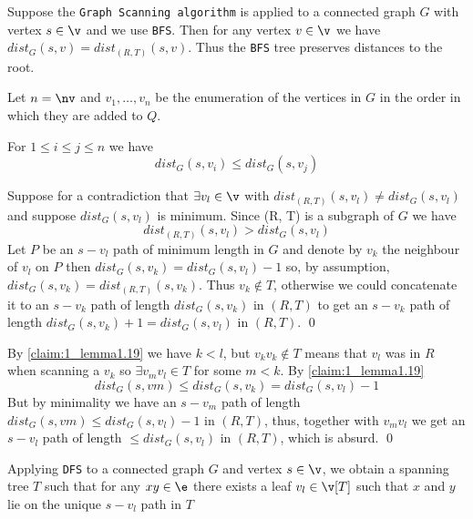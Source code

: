 \begin{lemma}
    Suppose the \texttt{Graph Scanning algorithm} is applied to a connected graph $G$ with vertex $s \in \v$ and we use \texttt{BFS}. Then for any vertex $v \in \v$ we have $dist_G(s, v) = dist_{(R, T)}(s, v)$. Thus the \texttt{BFS} tree preserves distances to the root.
\end{lemma}
\begin{prf}
    Let $n = \nv$ and $v_1, \dots, v_n$ be the enumeration of the vertices in $G$ in the order in which they are added to $Q$.
    \begin{claim}
        \label{claim:1_lemma1.19}
        For $1 \leq i \leq j \leq n$ we have
        \begin{equation*}
            dist_G(s, v_i) \leq dist_G(s, v_j)
        \end{equation*}
    \end{claim}
    \begin{prf}
        Suppose for a contradiction that $\exists v_l \in \v$ with $dist_{(R, T)}(s, v_l) \neq dist_G(s, v_l)$ and suppose $dist_G(s, v_l)$ is minimum. Since (R, T) is a subgraph of $G$ we have
        \begin{equation*}
            dist_{(R, T)}(s, v_l) > dist_G(s, v_l)
        \end{equation*}
        Let $P$ be an $s - v_l$ path of minimum length in $G$ and denote by $v_k$ the neighbour of $v_l$ on $P$ then $dist_G(s, v_k) = dist_G(s, v_l) - 1$ so, by assumption, $dist_G(s, v_k) = dist_{(R, T)}(s, v_k)$.
        Thus $v_k \notin T$, otherwise we could concatenate it to an $s - v_k$ path of length $dist_G(s, v_k)$ in $(R, T)$ to get an $s - v_k$ path of length $dist_G(s, v_k) + 1 = dist_G(s, v_l)$ in $(R, T)$. \qed
    \end{prf}
    By \ref{claim:1_lemma1.19} we have $k < l$, but $v_kv_k \notin T$ means that $v_l$ was in $R$ when scanning a $v_k$ so $\exists v_mv_l \in T$ for some $m < k$. By \ref{claim:1_lemma1.19}
    \begin{equation*}
        dist_G(s, vm) \leq dist_G(s, v_k) = dist_G(s, v_l) - 1
    \end{equation*}
    But by minimality we have an $s - v_m$ path of length $dist_G(s, vm) \leq dist_G(s, v_l) - 1$ in $(R, T)$, thus, together with $v_mv_l$ we get an $s - v_l$ path of length $\leq dist_G(s, v_l)$ in $(R, T)$, which is absurd. \qed
\end{prf}
\begin{lemma}
    Applying \texttt{DFS} to a connected graph $G$ and vertex $s \in \v$, we obtain a spanning tree $T$ such that for any $xy \in \e$ there exists a leaf $v_l \in \v[T]$ such that $x$ and $y$ lie on the unique $s - v_l$ path in $T$
\end{lemma}

